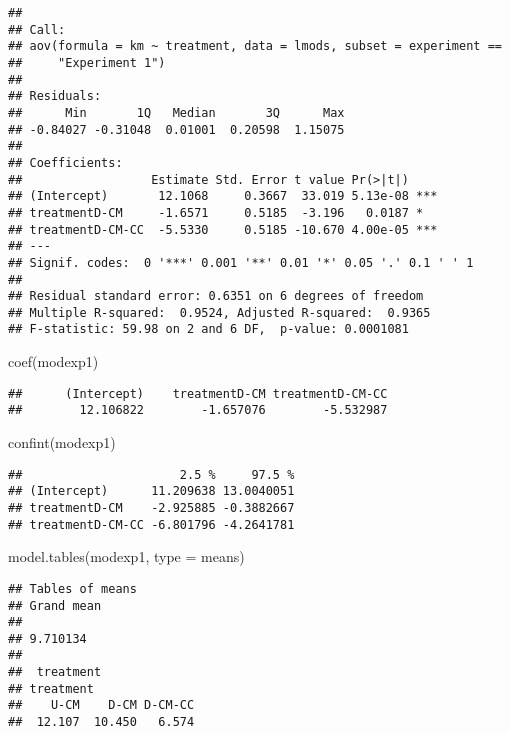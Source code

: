 \documentclass[
]{article}
\newenvironment{Shaded}{\begin{snugshade}}{\end{snugshade}}
\newcommand{\AttributeTok}[1]{\textcolor[rgb]{0.77,0.63,0.00}{#1}}
\newcommand{\FunctionTok}[1]{\textcolor[rgb]{0.00,0.00,0.00}{#1}}
\newcommand{\NormalTok}[1]{#1}
\newcommand{\StringTok}[1]{\textcolor[rgb]{0.31,0.60,0.02}{#1}}
\begin{document}
\begin{verbatim}
## 
## Call:
## aov(formula = km ~ treatment, data = lmods, subset = experiment == 
##     "Experiment 1")
## 
## Residuals:
##      Min       1Q   Median       3Q      Max 
## -0.84027 -0.31048  0.01001  0.20598  1.15075 
## 
## Coefficients:
##                  Estimate Std. Error t value Pr(>|t|)    
## (Intercept)       12.1068     0.3667  33.019 5.13e-08 ***
## treatmentD-CM     -1.6571     0.5185  -3.196   0.0187 *  
## treatmentD-CM-CC  -5.5330     0.5185 -10.670 4.00e-05 ***
## ---
## Signif. codes:  0 '***' 0.001 '**' 0.01 '*' 0.05 '.' 0.1 ' ' 1
## 
## Residual standard error: 0.6351 on 6 degrees of freedom
## Multiple R-squared:  0.9524, Adjusted R-squared:  0.9365 
## F-statistic: 59.98 on 2 and 6 DF,  p-value: 0.0001081
\end{verbatim}

\begin{Shaded}
\begin{Highlighting}[]
\FunctionTok{coef}\NormalTok{(modexp1)}
\end{Highlighting}
\end{Shaded}

\begin{verbatim}
##      (Intercept)    treatmentD-CM treatmentD-CM-CC 
##        12.106822        -1.657076        -5.532987
\end{verbatim}

\begin{Shaded}
\begin{Highlighting}[]
\FunctionTok{confint}\NormalTok{(modexp1)}
\end{Highlighting}
\end{Shaded}

\begin{verbatim}
##                      2.5 %     97.5 %
## (Intercept)      11.209638 13.0040051
## treatmentD-CM    -2.925885 -0.3882667
## treatmentD-CM-CC -6.801796 -4.2641781
\end{verbatim}

\begin{Shaded}
\begin{Highlighting}[]
\FunctionTok{model.tables}\NormalTok{(modexp1, }\AttributeTok{type =} \StringTok{\textquotesingle{}means\textquotesingle{}}\NormalTok{)}
\end{Highlighting}
\end{Shaded}

\begin{verbatim}
## Tables of means
## Grand mean
##          
## 9.710134 
## 
##  treatment 
## treatment
##    U-CM    D-CM D-CM-CC 
##  12.107  10.450   6.574
\end{verbatim}
\end{document}
